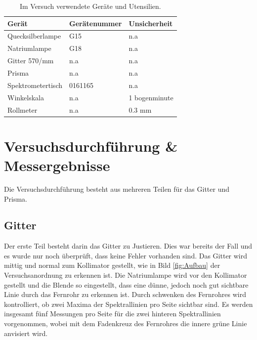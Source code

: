 \documentclass[12pt,a4paper,twoside]{article}
\begin{document}
    \begin{table}[H]
        \centering
        \caption{Im Versuch verwendete Geräte und Utensilien.}
        \label{tab:geraete}
        \begin{tabular}{| l | l | l |}
            \hline
            Gerät  & Gerätenummer  & Unsicherheit \\
            \hline
            Quecksilberlampe & G15 & {n.a} \\
            Natriumlampe & G18 & {n.a} \\
            Gitter 570/mm & {n.a} & {n.a} \\
            Prisma & {n.a} & {n.a} \\
            Spektrometertisch & 0161165 & {n.a} \\
            Winkelskala & {n.a} & 1 bogenminute \\
            Rollmeter & {n.a} & 0.3 mm \\
            \hline
        \end{tabular}
    \end{table}


\section{Versuchsdurchführung \& Messergebnisse} %
Die Versuchsdurchführung besteht aus mehreren Teilen für das Gitter und Prisma. 

\subsection{Gitter}

Der erste Teil besteht darin das Gitter zu Justieren. Dies war bereits der Fall und es wurde nur noch überprüft, dass keine Fehler vorhanden sind. Das Gitter wird mittig und normal zum Kollimator gestellt, wie in Bild \ref{fig:Aufbau} der Versuchsanordnung zu erkennen ist. 
Die Natriumlampe wird vor den Kollimator gestellt und die Blende so eingestellt, dass eine dünne, jedoch noch gut sichtbare Linie durch das Fernrohr zu erkennen ist. 
Durch schwenken des Fernrohres wird kontrolliert, ob zwei Maxima der Spektrallinien pro Seite sichtbar sind. 
Es werden insgesamt fünf Messungen pro Seite für die zwei hinteren Spektrallinien vorgenommen, wobei mit dem Fadenkreuz des Fernrohres die innere grüne Linie anvisiert wird. 
\end{document}
